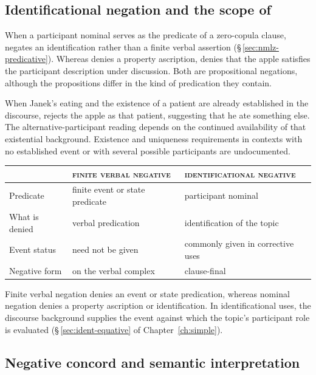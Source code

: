 \subsection{Identificational negation and the scope of }
\label{sec:vm-ident-neg}

When a participant nominal serves as the predicate of a zero-copula clause,
 negates an identification rather than a finite verbal assertion
(§\,\ref{sec:nmlz-predicative}). Whereas 
 denies a property ascription,
 
denies that the apple satisfies the participant description under discussion.
Both are propositional negations, although the propositions differ in the kind
of predication they contain.

When Janek's eating and the existence of a patient are already established in
the discourse,  rejects the apple as that
patient, suggesting that he ate something else. The alternative-participant
reading depends on the continued availability of that existential background.
Existence and uniqueness requirements in contexts with no established event or
with several possible participants are undocumented.

\medskip

\noindent\begin{tabularx}{\linewidth}{l L L}
\toprule
& \textsc{finite verbal negative} & \textsc{identificational negative} \\
\midrule
Predicate & finite event or state predicate & participant nominal \\
What is denied & verbal predication & identification of the topic \\
Event status & need not be given & commonly given in corrective uses \\
Negative form &  on the verbal complex & clause-final  \\
\bottomrule
\end{tabularx}

\medskip

Finite verbal negation denies an event or state predication, whereas nominal
negation denies a property ascription or identification. In identificational
uses, the discourse background supplies the event against which the topic's
participant role is evaluated (§\,\ref{sec:ident-equative} of
Chapter~\ref{ch:simple}).

\subsection{Negative concord and semantic interpretation}
\label{sec:vm-negative-concord}


